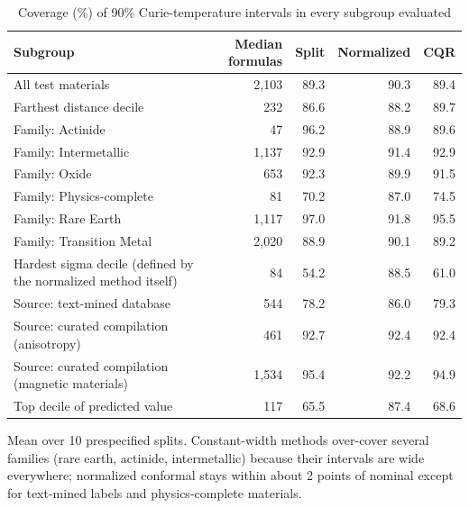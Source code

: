 \begin{table}
\caption{Coverage (\%) of 90\% Curie-temperature intervals in every subgroup evaluated}
\label{tab:tableS11_curie_subgroups}
\tablefont
\begin{tabularx}{\textwidth}{@{}>{\raggedright\arraybackslash}Xrrrr@{}}
\toprule
\textbf{Subgroup} & \textbf{Median formulas} & \textbf{Split} & \textbf{Normalized} & \textbf{CQR} \\
\midrule
All test materials & 2,103 & 89.3 & 90.3 & 89.4 \\
Farthest distance decile & 232 & 86.6 & 88.2 & 89.7 \\
Family: Actinide & 47 & 96.2 & 88.9 & 89.6 \\
Family: Intermetallic & 1,137 & 92.9 & 91.4 & 92.9 \\
Family: Oxide & 653 & 92.3 & 89.9 & 91.5 \\
Family: Physics-complete & 81 & 70.2 & 87.0 & 74.5 \\
Family: Rare Earth & 1,117 & 97.0 & 91.8 & 95.5 \\
Family: Transition Metal & 2,020 & 88.9 & 90.1 & 89.2 \\
Hardest sigma decile (defined by the normalized method itself) & 84 & 54.2 & 88.5 & 61.0 \\
Source: text-mined database & 544 & 78.2 & 86.0 & 79.3 \\
Source: curated compilation (anisotropy) & 461 & 92.7 & 92.4 & 92.4 \\
Source: curated compilation (magnetic materials) & 1,534 & 95.4 & 92.2 & 94.9 \\
Top decile of predicted value & 117 & 65.5 & 87.4 & 68.6 \\
\bottomrule
\end{tabularx}
\par\vspace{4pt}\raggedright\noindent Mean over 10 prespecified splits. Constant-width methods over-cover several families (rare earth, actinide, intermetallic) because their intervals are wide everywhere; normalized conformal stays within about 2 points of nominal except for text-mined labels and physics-complete materials.
\end{table}
